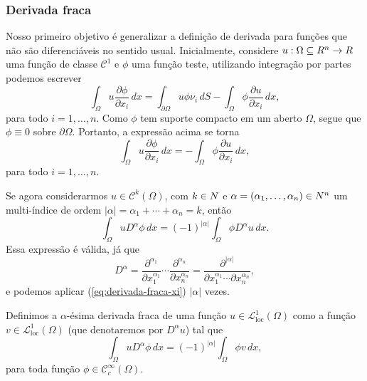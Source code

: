 \documentclass[xcolor=dvipsnames, aspectratio=169, 10pt]{beamer}
\let\mathbb\relax
\newcommand{\bN}{\mathbb{N}}
\newcommand{\bR}{\mathbb{R}}
\newcommand{\cC}{\mathcal{C}}
\newcommand{\cL}{\mathcal{L}}
\newcommand{\loc}{\mathrm{loc}}
\begin{document}
\begin{frame}
    \frametitle{Derivada fraca}
    Nosso primeiro objetivo é generalizar a definição de derivada para funções que não são diferenciáveis no sentido usual. \pause
    Inicialmente, considere $u : \Omega \subseteq \bR^n \to \bR$ uma função de classe $\cC^1$ e $\phi$ uma função teste, utilizando integração por partes podemos escrever
    \[
        \int_{\Omega} u \frac{\partial \phi}{\partial x_i} \,dx = \int_{\partial \Omega} u \phi \nu_i \,dS - \int_{\Omega} \phi \frac{\partial u}{\partial x_i} \,dx,
    \]
    para todo $i = 1,\dots,n$. \pause
    Como $\phi$ tem suporte compacto em um aberto $\Omega$, segue que $\phi \equiv 0$ sobre $\partial \Omega$. Portanto, a expressão acima se torna
    \begin{equation} \label{eq:derivada-fraca-xi}
        \int_{\Omega} u \frac{\partial \phi}{\partial x_i} \,dx = -\int_{\Omega} \phi \frac{\partial u}{\partial x_i} \,dx,
    \end{equation}
    para todo $i = 1,\dots,n$.
\end{frame}
\begin{frame}
    Se agora considerarmos $u \in \cC^k(\Omega)$, com $k \in \bN$ e $\alpha = (\alpha_1,\dots,\alpha_n) \in \bN^n$ um multi-índice de ordem $|\alpha| = \alpha_1 + \cdots + \alpha_n = k$, então
    \begin{equation} \label{eq:derivada-fraca}
        \int_{\Omega} u D^{\alpha} \phi \,dx = (-1)^{|\alpha|} \int_{\Omega} \phi D^{\alpha} u \,dx.
    \end{equation}
    Essa expressão é válida, já que
    \[
        D^{\alpha} = \dfrac{\partial^{\alpha_1} }{\partial x_1^{\alpha_1}} \cdots \dfrac{\partial^{\alpha_n} }{\partial x_n^{\alpha_n}} = \dfrac{\partial^{|\alpha|} }{\partial x_1^{\alpha_1} \cdots \partial x_n^{\alpha_n}},
    \]
    e podemos aplicar (\ref{eq:derivada-fraca-xi}) $|\alpha|$ vezes.
\end{frame}
\begin{frame}

    Definimos a $\alpha$-ésima derivada fraca de uma função $u \in \cL^1_{\loc}(\Omega)$ como a função $v \in \cL^1_{\loc}(\Omega)$ (que denotaremos por $D^\alpha u$) tal que
    \[
        \int_{\Omega} u D^\alpha \phi \,dx = (-1)^{|\alpha|} \int_{\Omega} \phi v\,dx,
    \]
    para toda função $\phi \in \cC^{\infty}_c(\Omega)$.
\end{frame}
\end{document}
